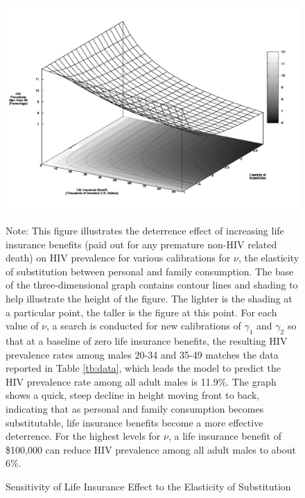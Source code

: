 \documentclass[12pt]{article}
\begin{document}
\begin{figure}
\begin{center}
\caption{Sensitivity of Life Insurance Effect to the Elasticity of Substitution}\label{fg:insnu}
\includegraphics[scale=0.33]{images/hivBsub.png} \\
\parbox{5.5in}{\footnotesize{Note: This figure illustrates the deterrence effect of increasing life insurance benefits (paid out for any premature non-HIV related death) on HIV prevalence for various calibrations for $\nu$, the elasticity of substitution between personal and family consumption.  The base of the three-dimensional graph contains contour lines and shading to help illustrate the height of the figure.  The lighter is the shading at a particular point, the taller is the figure at this point.  For each value of $\nu$, a search is conducted for new calibrations of $\gamma_1$ and $\gamma_2$ so that at a baseline of zero life insurance benefits, the resulting HIV prevalence rates among males 20-34 and 35-49 matches the data reported in Table \ref{tb:data}, which leads the model to predict the HIV prevalence rate among all adult males is 11.9\%.  The graph shows a quick, steep decline in height moving front to back, indicating that as personal and family consumption becomes substitutable, life insurance benefits become a more effective deterrence.  For the highest levels for $\nu$, a life insurance benefit of \$100,000 can reduce HIV prevalence among all adult males to about 6\%. }}
\end{center}
\end{figure}
\end{document}
